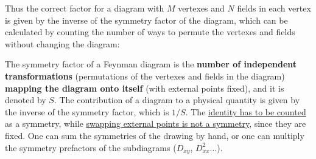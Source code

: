 Thus the correct factor for a diagram with \(M\) vertexes and \(N\) fields in each vertex is given by the inverse of the symmetry factor of the diagram, which can be calculated by counting the number of ways to permute the vertexes and fields without changing the diagram:
\begin{definition}
    The symmetry factor of a Feynman diagram is the \textbf{number of independent transformations} (permutations of the vertexes and fields in the diagram) \textbf{mapping the diagram onto itself} (with external points fixed), and it is denoted by \(S\). The contribution of a diagram to a physical quantity is given by the inverse of the symmetry factor, which is \(1/S\). The \uline{identity has to be counted} as a symmetry, while \uline{swapping external points is not a symmetry}, since they are fixed. One can sum the symmetries of the drawing by hand, or one can multiply the symmetry prefactors of the subdiagrams (\(D_{xy}\), \(D_{xx}^2\)...).
\end{definition}

